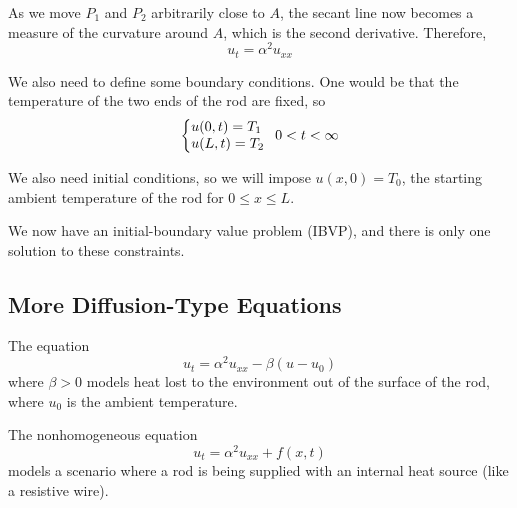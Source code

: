 \documentclass{article}
\begin{document}
  As we move $P_1$ and $P_2$ arbitrarily close to $A$, the secant line now becomes a measure of the curvature around $A$, which is the second derivative. Therefore, $$u_t = \alpha^2 u_{xx}$$

We also need to define some boundary conditions. One would be that the temperature of the two ends of the rod are fixed, so $$\left\{\begin{array}{@{}l@{}} u(0,t) = T_1 \\ u(L,t) = T_2\end{array}\right.\,{\ 0<t<\infty}$$

We also need initial conditions, so we will impose $u(x,0) = T_0$, the starting ambient temperature of the rod for $0\leq x \leq L$.

We now have an initial-boundary value problem (IBVP), and there is only one solution to these constraints.

\subsection{More Diffusion-Type Equations}

The equation $$u_t = \alpha^2u_{xx} - \beta(u-u_0)$$where $\beta >0$ models heat lost to the environment out of the surface of the rod, where $u_0$ is the ambient temperature.

The nonhomogeneous equation $$u_t = \alpha^2 u_{xx} + f(x,t)$$models a scenario where a rod is being supplied with an internal heat source (like a resistive wire).
\end{document}
